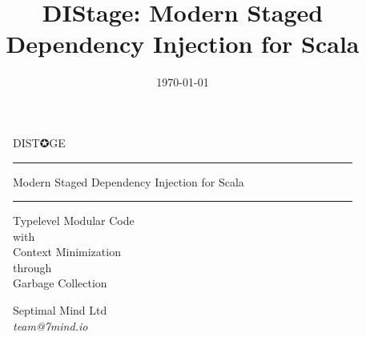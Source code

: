 \documentclass[usenames,dvipsnames]{beamer}
\title[DIStage]{DIStage: Modern Staged Dependency Injection for Scala}
\institute[Septimal Mind Ltd]
    {
    Septimal Mind Ltd\\
    \medskip
    \textit{team@7mind.io}
    }
\date{\today}
\begin{document}

\begin{frame}
\begin{figure}
\Huge 
\color{RubineRed} DIST✪GE
\noindent
\rule{\linewidth}{1mm}
\Large Modern Staged Dependency Injection for Scala
\rule{\linewidth}{1mm}
\end{figure}

\begin{figure}
\color{RubineRed}
\normalsize Type\-level Modular Code \\
with \\
Context Minimization \\
through \\
Garbage Collection
\end{figure}

\begin{figure}
\Large Septimal Mind Ltd \\
\medskip
\textit{team@7mind.io}
\end{figure}

\end{frame}

\end{document}
